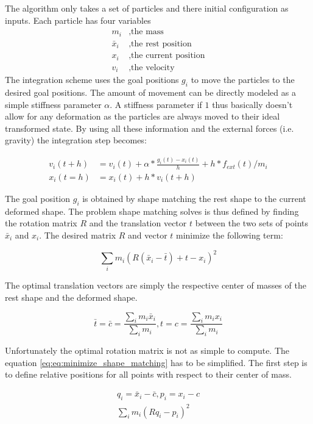 The algorithm only takes a set of particles and there initial configuration as inputs. Each particle has four variables
\begin{align*}
m_i &, \text{the mass} \\
\bar{x}_i &, \text{the rest position} \\
x_i &, \text{the current position} \\
v_i &, \text{the velocity}
\end{align*}
The integration scheme uses the goal positions \(g_i\) to move the particles to the desired goal positions. The amount of movement can be directly modeled as a simple stiffness parameter \(\alpha\). A stiffness parameter if \(1\) thus basically doesn't allow for any deformation as the particles are always moved to their ideal transformed state. By using all these information and the external forces (i.e. gravity) the integration step becomes:

\begin{align}
v_i(t+h) &= v_i(t) + \alpha * \frac{g_i(t)-x_i(t)}{h} + h * f_{ext}(t)/m_i \\
x_i(t=h) &= x_i(t) + h * v_i(t+h)
\end{align}

The goal position \(g_i\) is obtained by shape matching the rest shape to the current deformed shape. The problem shape matching solves is thus defined by finding the rotation matrix \(R\) and the translation vector \(t\) between the two sets of points \(\bar{x}_i\) and \(x_i\). The desired matrix \(R\) and vector \(t\) minimize the following term:

\begin{equation}
\sum\limits_i m_i(R(\bar{x}_i-\bar{t})+t-x_i)^2
\label{eq:minimize_shape_matching}
\end{equation}

The optimal translation vectors are simply the respective center of masses of the rest shape and the deformed shape.

\begin{equation}
\bar{t} = \bar{c} = \frac{\sum_{i} m_i \bar{x}_i}{\sum_{i}m_i}, t = c = \frac{\sum_{i} m_i x_i}{\sum_{i}m_i}
\end{equation}

Unfortunately the optimal rotation matrix is not as simple to compute. The equation \ref{eq:eq:minimize_shape_matching} has to be simplified. The first step is to define relative positions for all points with respect to their center of mass.

\begin{gather}
q_i = \bar{x}_i - \bar{c}, p_i = x_i - c \\
\sum\limits_i m_i(Rq_i-p_i)^2
\end{gather}


